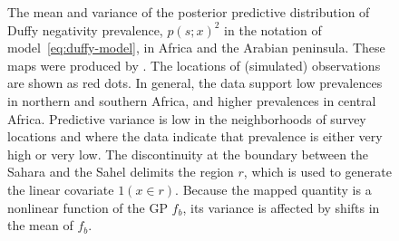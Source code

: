 \documentclass[article]{jss}
\begin{document}
\begin{figure}
\begin{center}
    \caption{The mean and variance of the posterior predictive distribution of Duffy negativity prevalence, $p(s;x)^2$ in the notation of model~\ref{eq:duffy-model}, in Africa and the Arabian peninsula. These maps were produced by . The locations of (simulated) observations are shown as red dots. In general, the data support low prevalences in northern and southern Africa, and higher prevalences in central Africa. Predictive variance is low in the neighborhoods of survey locations and where the data indicate that prevalence is either very high or very low. The discontinuity at the boundary between the Sahara and the Sahel delimits the region $r$, which is used to generate the linear covariate $1(x\in r)$. Because the mapped quantity is a nonlinear function of the GP $f_b$, its variance is affected by shifts in the mean of $f_b$. }
    \label{fig:duffymaps}
\end{center}    
\end{figure}
\end{document}
